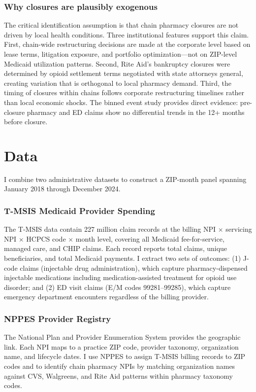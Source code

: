\documentclass[12pt]{article}
\begin{document}
\subsubsection*{Why closures are plausibly exogenous} The critical identification assumption is that chain pharmacy closures are not driven by local health conditions. Three institutional features support this claim. First, chain-wide restructuring decisions are made at the corporate level based on lease terms, litigation exposure, and portfolio optimization---not on ZIP-level Medicaid utilization patterns. Second, Rite Aid's bankruptcy closures were determined by opioid settlement terms negotiated with state attorneys general, creating variation that is orthogonal to local pharmacy demand. Third, the timing of closures within chains follows corporate restructuring timelines rather than local economic shocks. The binned event study provides direct evidence: pre-closure pharmacy and ED claims show no differential trends in the 12+ months before closure.

\section{Data}

I combine two administrative datasets to construct a ZIP-month panel spanning January 2018 through December 2024.

\subsubsection*{T-MSIS Medicaid Provider Spending} The T-MSIS data contain 227 million claim records at the billing NPI $\times$ servicing NPI $\times$ HCPCS code $\times$ month level, covering all Medicaid fee-for-service, managed care, and CHIP claims. Each record reports total claims, unique beneficiaries, and total Medicaid payments. I extract two sets of outcomes: (1) J-code claims (injectable drug administration), which capture pharmacy-dispensed injectable medications including medication-assisted treatment for opioid use disorder; and (2) ED visit claims (E/M codes 99281--99285), which capture emergency department encounters regardless of the billing provider.

\subsubsection*{NPPES Provider Registry} The National Plan and Provider Enumeration System provides the geographic link. Each NPI maps to a practice ZIP code, provider taxonomy, organization name, and lifecycle dates. I use NPPES to assign T-MSIS billing records to ZIP codes and to identify chain pharmacy NPIs by matching organization names against CVS, Walgreens, and Rite Aid patterns within pharmacy taxonomy codes.
\end{document}
